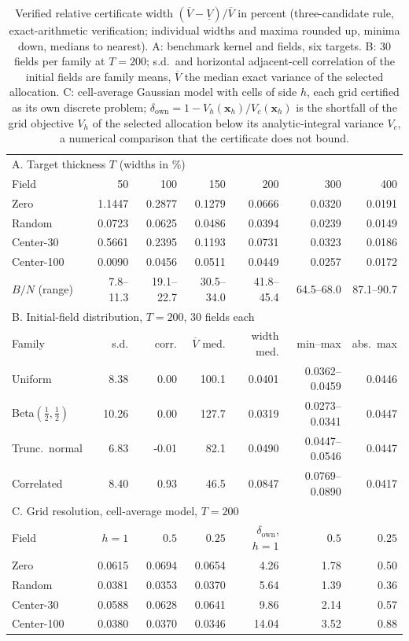 \begin{table}[!tbp]\centering\footnotesize\setlength{\tabcolsep}{3pt}
\caption{Verified relative certificate width $(\overline V-\underline V)/\overline V$ in percent
(three-candidate rule, exact-arithmetic verification; individual widths and maxima rounded up,
minima down, medians to nearest). A: benchmark kernel and fields, six targets. B: $30$ fields per
family at $T=200$; s.d.\ and horizontal adjacent-cell correlation of the initial fields are family
means, $\overline V$ the median exact variance of the selected allocation. C: cell-average Gaussian
model with cells of side $h$, each grid certified as its own discrete problem;
$\delta_{\mathrm{own}}=1-V_h(\mathbf{x}_h)/V_c(\mathbf{x}_h)$ is the shortfall of the grid objective
$V_h$ of the selected allocation below its analytic-integral variance $V_c$, a numerical
comparison that the certificate does not bound.}
\label{tab:sensitivity-ext}
\begin{tabular}{lrrrrrr}
\toprule
\multicolumn{7}{l}{A. Target thickness $T$ (widths in \%)}\\
Field & 50 & 100 & 150 & 200 & 300 & 400\\
\midrule
Zero        & 1.1447 & 0.2877 & 0.1279 & 0.0666 & 0.0320 & 0.0191\\
Random      & 0.0723 & 0.0625 & 0.0486 & 0.0394 & 0.0239 & 0.0149\\
Center-30   & 0.5661 & 0.2395 & 0.1193 & 0.0731 & 0.0323 & 0.0186\\
Center-100  & 0.0090 & 0.0456 & 0.0511 & 0.0449 & 0.0257 & 0.0172\\
$B/N$ (range) & 7.8--11.3 & 19.1--22.7 & 30.5--34.0 & 41.8--45.4 & 64.5--68.0 & 87.1--90.7\\
\midrule
\multicolumn{7}{l}{B. Initial-field distribution, $T=200$, $30$ fields each}\\
Family & s.d. & corr. & $\overline V$ med. & width med. & min--max & abs.\ max\\
\midrule
Uniform & 8.38 & 0.00 & 100.1 & 0.0401 & 0.0362--0.0459 & 0.0446\\
Beta$(\tfrac12,\tfrac12)$ & 10.26 & 0.00 & 127.7 & 0.0319 & 0.0273--0.0341 & 0.0447\\
Trunc.\ normal & 6.83 & -0.01 & 82.1 & 0.0490 & 0.0447--0.0546 & 0.0447\\
Correlated & 8.40 & 0.93 & 46.5 & 0.0847 & 0.0769--0.0890 & 0.0417\\
\midrule
\multicolumn{7}{l}{C. Grid resolution, cell-average model, $T=200$}\\
Field & $h{=}1$ & $0.5$ & $0.25$ & $\delta_{\mathrm{own}}$, $h{=}1$ & $0.5$ & $0.25$\\
\midrule
Zero        & 0.0615 & 0.0694 & 0.0654 & 4.26 & 1.78 & 0.50\\
Random      & 0.0381 & 0.0353 & 0.0370 & 5.64 & 1.39 & 0.36\\
Center-30   & 0.0588 & 0.0628 & 0.0641 & 9.86 & 2.14 & 0.57\\
Center-100  & 0.0380 & 0.0370 & 0.0346 & 14.04 & 3.52 & 0.88\\
\bottomrule
\end{tabular}
\end{table}
